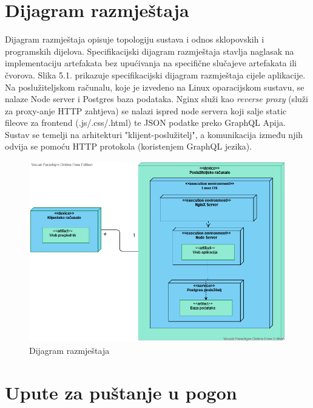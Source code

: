 			
			\eject 
		
		
		\section{Dijagram razmještaja}
			
			Dijagram razmještaja opisuje topologiju sustava i odnos sklopovskih i programskih dijelova.
			Specifikacijski dijagram razmještaja stavlja naglasak na implementaciju artefakata bez upućivanja na specifične slučajeve artefakata ili čvorova.
			Slika 5.1. prikazuje specifikacijski dijagram razmještaja cijele aplikacije.
			Na poslužiteljskom računalu, koje je izvedeno na Linux oparacijskom sustavu, se nalaze Node server i Postgres baza podataka. Nginx služi kao \textit{reverse proxy} (služi za proxy-anje HTTP zahtjeva) se nalazi ispred node servera koji salje static fileove za frontend (.js/.css/.html) te JSON podatke preko GraphQL Apija. Sustav se temelji na arhitekturi "klijent-poslužitelj", a komunikacija između njih odvija se pomoću HTTP protokola (koristenjem GraphQL jezika).
			
			\begin{figure}[H]
				\includegraphics[width=\textwidth]{slike/dijagramrazmjestaja.png}
				\caption{Dijagram razmještaja}
				\label{fig:baza} 
			\end{figure}
			
			\eject 
		
		\section{Upute za puštanje u pogon}

